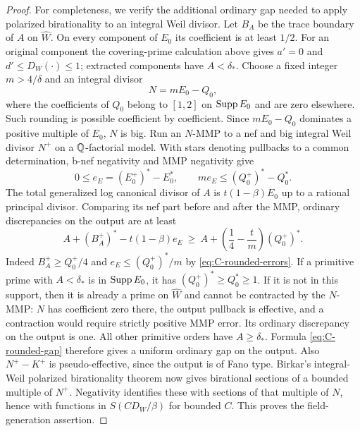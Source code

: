 \begin{proof}
For completeness, we verify the additional ordinary gap needed to
apply polarized birationality to an integral Weil divisor.  Let $B_A$
be the trace boundary of $A$ on $\widehat W$.  On every component of
$E_0$ its coefficient is at least $1/2$.  For an original component the
covering-prime calculation above gives $a'=0$ and
$d'\leq D_W(\cdot)\leq1$; extracted components have $A<\delta_*$.
Choose a fixed integer $m>4/\delta$ and an integral divisor
\[
                     N=mE_0-Q_0,
\]
where the coefficients of $Q_0$ belong to $[1,2]$ on $\operatorname{Supp} E_0$ and
are zero elsewhere.  Such rounding is possible coefficient by
coefficient.  Since $mE_0-Q_0$ dominates a positive multiple of $E_0$,
$N$ is big.  Run an $N$-MMP to a nef and big integral Weil divisor
$N^+$ on a $\mathbb Q$-factorial model.  With stars denoting pullbacks to a
common determination, b-nef negativity and MMP negativity give
\begin{equation}\label{eq:C-rounded-errors}
 0\leq e_E=(E_0^+)^*-E_0^*,\qquad
             me_E\leq(Q_0^+)^*-Q_0^*.
\end{equation}
The total generalized log canonical divisor of $A$ is
$t(1-\beta)E_0$ up to a rational principal divisor.  Comparing its nef
part before and after the MMP, ordinary discrepancies on the output
are at least
\begin{equation}\label{eq:C-rounded-gap}
 A+(B_A^+)^*-t(1-\beta)e_E
 \ \geq\ A+\left(\frac14-\frac tm\right)(Q_0^+)^*.
\end{equation}
Indeed $B_A^+\geq Q_0^+/4$ and
$e_E\leq(Q_0^+)^*/m$ by \eqref{eq:C-rounded-errors}.
If a primitive prime with $A<\delta_*$ is in $\operatorname{Supp} E_0$, it has
$(Q_0^+)^*\geq Q_0^*\geq1$.  If it is not in this support, then it
is already a prime on $\widehat W$ and cannot be contracted by the
$N$-MMP: $N$ has coefficient zero there, the output pullback is
effective, and a contraction would require strictly positive MMP
error.  Its ordinary discrepancy on the output is one.  All other
primitive orders have $A\geq\delta_*$.  Formula
\eqref{eq:C-rounded-gap} therefore gives a uniform ordinary gap on the
output.  Also $N^+-K^+$ is pseudo-effective, since the output is of
Fano type.  Birkar's integral-Weil polarized birationality theorem
\cite[Theorem~1.1]{BirkarPolarised} now gives birational sections of a
bounded multiple of $N^+$.  Negativity identifies these with sections
of that multiple of $N$, hence with functions in $S(CD_W/\beta)$ for
bounded $C$.  This proves the field-generation assertion.


\end{proof}
